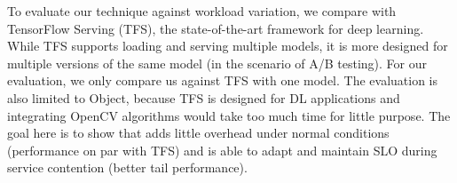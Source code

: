To evaluate our technique against workload variation, we compare \sysname{} with
TensorFlow Serving (TFS), the state-of-the-art framework for deep
learning. While TFS supports loading and serving multiple models, it is more
designed for multiple versions of the same model (in the scenario of A/B
testing). For our evaluation, we only compare us against TFS with one model. The
evaluation is also limited to Object, because TFS is designed for DL
applications and integrating OpenCV algorithms would take too much time for
little purpose. The goal here is to show that \sysname{} adds little overhead
under normal conditions (performance on par with TFS) and is able to adapt and
maintain SLO during service contention (better tail performance).


\newpage

